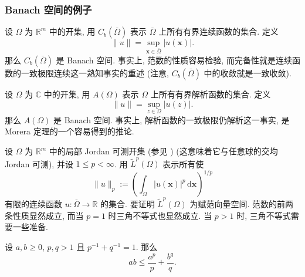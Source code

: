 \subsubsection{Banach 空间的例子}\label{subsec:banach-space-examples}

\begin{Example}
\label{ex:bounded-continuous-functions-banach}
设 $\Omega$ 为 $\mathbb{R}^m$ 中的开集, 用 $C_b(\overline\Omega)$ 表示 $\overline\Omega$ 上所有有界连续函数的集合. 定义
\begin{equation}\label{eq:bounded-continuous-functions-supremum-norm}
\|u\|=\sup_{\bm{x}\in\overline\Omega}|u(\bm{x})|.
\end{equation}
那么 $C_b(\overline\Omega)$ 是 Banach 空间. 事实上, 范数的性质容易检验, 而完备性就是连续函数的一致极限连续这一熟知事实的重述 (注意, $C_b(\overline\Omega)$ 中的收敛就是一致收敛).
\end{Example}

\begin{Example}
\label{ex:bounded-analytic-functions-banach}
设 $\Omega$ 为 $\mathbb{C}$ 中的开集, 用 $A(\Omega)$ 表示 $\Omega$ 上所有有界解析函数的集合. 定义
\begin{equation}\label{eq:bounded-analytic-functions-supremum-norm}
\|u\|=\sup_{z\in\Omega}|u(z)|.
\end{equation}
那么 $A(\Omega)$ 是 Banach 空间. 事实上, 解析函数的一致极限仍解析这一事实, 是 Morera 定理的一个容易得到的推论.
\end{Example}

\begin{Example}
\label{ex:continuous-functions-lp-norm}
设 $\Omega$ 为 $\mathbb{R}^m$ 中的局部 Jordan 可测开集 (参见 \cite{Bu}) (这意味着它与任意球的交均 Jordan 可测), 并设 $1\leq p<\infty$. 用 $\widetilde L^p(\Omega)$ 表示所有使
\begin{equation}\label{eq:continuous-functions-lp-integral-norm}
\|u\|_p:=\left(\int_\Omega|u(\bm{x})|^p\,\mathrm{d}\bm{x}\right)^{1/p}
\end{equation}
有限的连续函数 $u:\overline\Omega\to\mathbb{R}$ 的集合. 要证明 $\widetilde L^p(\Omega)$ 为赋范向量空间. 范数的前两条性质显然成立, 而当 $p=1$ 时三角不等式也显然成立. 当 $p>1$ 时, 三角不等式需要一些准备.
\end{Example}

\begin{Lemma}
\label{lem:young-conjugate-exponents-scalar-inequality}
设 $a,b\geq0$, $p,q>1$ 且 $p^{-1}+q^{-1}=1$. 那么
\begin{equation}\label{eq:young-conjugate-exponents-scalar-inequality}
ab\leq\dfrac{a^p}p+\dfrac{b^q}q.
\end{equation}

\end{Lemma}

